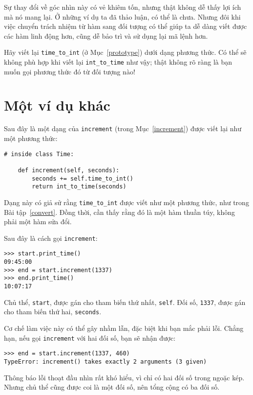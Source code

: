 \documentclass[11pt]{book}
\begin{document}
Sự thay đổi về góc nhìn này có vẻ khiêm tốn, nhưng thật không dễ thấy
lợi ích mà nó mang lại. Ở những ví dụ ta đã thảo luận, có thể là chưa.
Nhưng đôi khi việc chuyển trách nhiệm từ hàm sang đối tượng
có thể giúp ta dễ dàng viết được các hàm linh động hơn, cũng dễ bảo trì
và sử dụng lại mã lệnh hơn.

\begin{ex}
\label{convert}
Hãy viết lại \verb"time_to_int"
(ở Mục~\ref{prototype}) dưới dạng phương thức. Có thể sẽ không phù hợp
khi viết lại \verb"int_to_time" như vậy; thật không rõ ràng là bạn muốn
gọi phương thức đó từ đối tượng nào!
\end{ex}


\section{Một ví dụ khác}


Sau đây là một dạng của {\tt increment} (trong Mục~\ref{increment})
được viết lại như một phương thức:

\beforeverb
\begin{verbatim}
# inside class Time:

    def increment(self, seconds):
        seconds += self.time_to_int()
        return int_to_time(seconds)
\end{verbatim}
\afterverb
%
Dạng này có giả sử rằng \verb"time_to_int" được viết như một
phương thức, như trong Bài tập~\ref{convert}.  Đồng thời, cần thấy
rằng đó là một hàm thuần túy, không phải một hàm sửa đổi.

Sau đây là cách gọi {\tt increment}:

\beforeverb
\begin{verbatim}
>>> start.print_time()
09:45:00
>>> end = start.increment(1337)
>>> end.print_time()
10:07:17
\end{verbatim}
\afterverb
%
Chủ thể, {\tt start}, được gán cho tham biến thứ nhất,
{\tt self}.  Đối số, {\tt 1337}, được gán cho
tham biến thứ hai, {\tt seconds}.

Cơ chế làm việc này có thể gây nhầm lẫn, đặc biệt khi bạn mắc
phải lỗi. Chẳng hạn, nếu gọi {\tt increment} với hai đối số, bạn sẽ
nhận được:


\beforeverb
\begin{verbatim}
>>> end = start.increment(1337, 460)
TypeError: increment() takes exactly 2 arguments (3 given)
\end{verbatim}
\afterverb
%
Thông báo lỗi thoạt đầu nhìn rất khó hiểu, vì chỉ có hai đối số
trong ngoặc kép. Nhưng chủ thể cũng được coi là một đối số,
nên tổng cộng có ba đối số.
\end{document}
